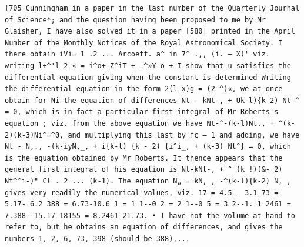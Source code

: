 \documentclass[11pt,a4paper]{book}
\begin{document}
\newpage
\setcounter{page}{580}
\begin{verbatim}
[705 Cunningham in a paper in the last number of the Quarterly Journal of Science*; and the question having been proposed to me by Mr Glaisher, I have also solved it in a paper [580] printed in the April Number of the Monthly Notices of the Royal Astronomical Society. I there obtain iVi= 1 .2 ... Arcoeff. a^ in 7^ .,, (i. — X)' viz. writing l+^'l—2 « = i^o+-Z^iT + -^»¥-o + I show that u satisfies the differential equation giving when the constant is determined Writing the differential equation in the form 2(l-x)g = (2-^)«, we at once obtain for Ni the equation of differences Nt - kNt-, + Uk-l){k-2) Nt-^ = 0, which is in fact a particular first integral of Mr Roberts's equation ; viz. from the above equation we have Nt-^-(k-l)Nt., + ^(k-2)(k-3)Ni^=^0, and multiplying this last by fc — 1 and adding, we have Nt - N,., -(k-iyN,_, + i{k-l) {k - 2) {i^i_, + (k-3) Nt^} = 0, which is the equation obtained by Mr Roberts. It thence appears that the general first integral of his equation is Nt-kNt-, + ^ (k !)(&- 2) Nt^^i-)" Cl . 2 ... (k-1). The equation N„ = kN,_, -^(k-l){k-2) N,_, gives very readily the numerical values, viz. 17 = 4.5 - 3.1 73 = 5.17- 6.2 388 = 6.73-10.6 1 = 1 1--0 2 = 2 1--0 5 = 3 2--1. 1 2461 = 7.388 -15.17 18155 = 8.2461-21.73. • I have not the volume at hand to refer to, but he obtains an equation of differences, and gives the numbers 1, 2, 6, 73, 398 (should be 388),... 
\end{verbatim}
\end{document}
